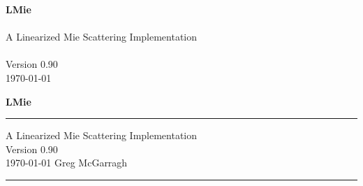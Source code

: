 %



\titleformat{\chapter}{\bf\LARGE}{\thechapter}{1em}{}


%
\newcommand{\version}{0.90}

\newcommand{\compresslist}{%
\vspace{-10.0pt}%
\setlength{\topsep}{0.0pt}%
\setlength{\partopsep}{0.0pt}%
\setlength{\itemsep}{1.25pt}%
}%


%


%





\frontmatter


\iftth
\begin{center}
{\huge \bfseries LMie} \\ \\
A Linearized Mie Scattering Implementation\\ \\
Version \version \\
\today
\end{center}
\else
\begin{titlepage}
\vspace*{1.25in}
{\noindent \huge \bfseries LMie} \\
\rule{\linewidth}{3.0pt}
\flushright
A Linearized Mie Scattering Implementation \\
Version \version \\
\usdate\today
\vfill
\flushleft
\Large Greg McGarragh
\rule{\linewidth}{1.5pt}
\end{titlepage}
\fi



